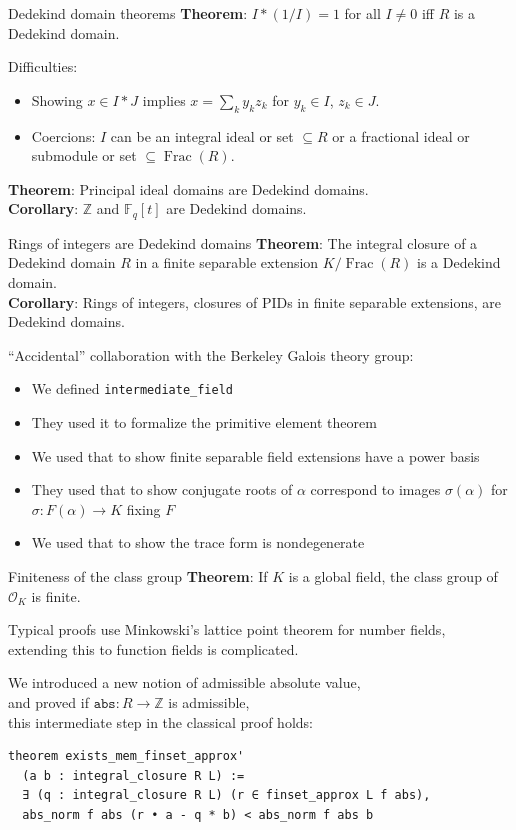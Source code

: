 \documentclass{beamer}
\newcommand{\lean}[1]{\texttt{#1}\xspace}
\newcommand*{\OK}[1][K]{\mathcal{O}_{#1}}
\newcommand*{\Fq}[1][q]{\mathbb{F}_{#1}}
\newcommand{\Z}{\mathbb{Z}}
\DeclareMathOperator{\Frac}{Frac}
\begin{document}
\begin{frame}{Dedekind domain theorems}
	\textbf{Theorem}: $I * (1 / I) = 1$ for all $I \ne 0$ iff $R$ is a Dedekind domain.

	Difficulties:
	\begin{itemize}
		\item Showing $x \in I * J$ implies $x = \sum_k y_k z_k$ for $y_k \in I$, $z_k \in J$.
		\item Coercions: $I$ can be an integral ideal or set $\subseteq R$ or a fractional ideal or submodule or set $\subseteq \Frac(R)$.
	\end{itemize}

\pause
	\textbf{Theorem}: Principal ideal domains are Dedekind domains.\\
	\textbf{Corollary}: $\Z$ and $\Fq[q][t]$ are Dedekind domains.
\end{frame}

\begin{frame}{Rings of integers are Dedekind domains}
	\textbf{Theorem}: The integral closure of a Dedekind domain $R$ in a finite separable extension $K / \Frac(R)$ is a Dedekind domain.\\
	\textbf{Corollary}: Rings of integers, closures of PIDs in finite separable extensions, are Dedekind domains.

\pause
	``Accidental'' collaboration with the Berkeley Galois theory group:
	\begin{itemize}
		\setlength\itemsep{-0.5\baselineskip}
		\item We defined \lean{intermediate\_field}
		\item They used it to formalize the primitive element theorem
		\item We used that to show finite separable field extensions have a power basis
		\item They used that to show conjugate roots of $\alpha$ correspond to images $\sigma(\alpha)$ for $\sigma : F(\alpha) \to K$ fixing $F$
		\item We used that to show the \alert{trace form} is nondegenerate
	\end{itemize}
\end{frame}

\begin{frame}[fragile]{Finiteness of the class group}
	\textbf{Theorem}: If $K$ is a global field, the class group of $\OK$ is finite.

	Typical proofs use Minkowski's lattice point theorem for number fields,\\
	extending this to function fields is complicated.

\pause
	We introduced a new notion of \alert{admissible absolute value},\\
	and proved if $\lean{abs} : R \to \Z$ is admissible,\\
	this intermediate step in the classical proof holds:
\begin{lstlisting}
theorem exists_mem_finset_approx'
  (a b : integral_closure R L) :=
  ∃ (q : integral_closure R L) (r ∈ finset_approx L f abs),
  abs_norm f abs (r • a - q * b) < abs_norm f abs b
\end{lstlisting}
\end{frame}
\end{document}

